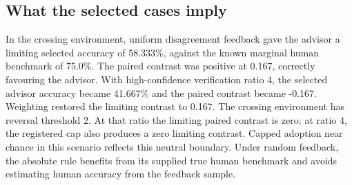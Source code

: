 \documentclass[
  british,
  11pt,
]{article}
\begin{document}
\subsection{What the selected cases
imply}\label{what-the-selected-cases-imply}

In the crossing environment, uniform disagreement feedback gave the
advisor a limiting selected accuracy of 58.333\%, against the known
marginal human benchmark of 75.0\%. The paired contrast was positive at
0.167, correctly favouring the advisor. With high-confidence
verification ratio 4, the selected advisor accuracy became 41.667\% and
the paired contrast became -0.167. Weighting restored the limiting
contrast to 0.167. The crossing environment has reversal threshold 2. At
that ratio the limiting paired contrast is zero; at ratio 4, the
registered cap also produces a zero limiting contrast. Capped adoption
near chance in this scenario reflects this neutral boundary. Under
random feedback, the absolute rule benefits from its supplied true human
benchmark and avoids estimating human accuracy from the feedback sample.

\end{document}
